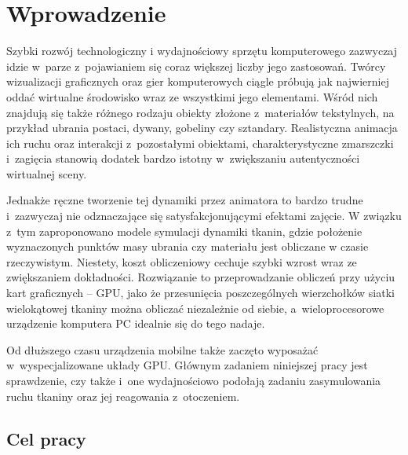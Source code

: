 \chapter{Wprowadzenie}
\label{t:wprowadzenie}

	
	Szybki rozwój technologiczny i wydajnościowy sprzętu komputerowego zazwyczaj idzie w~parze z~pojawianiem się coraz większej liczby jego zastosowań. Twórcy wizualizacji graficznych oraz gier komputerowych ciągle próbują jak najwierniej oddać wirtualne środowisko wraz ze wszystkimi jego elementami. Wśród nich znajdują się także różnego rodzaju obiekty złożone z~materiałów tekstylnych, na przykład ubrania postaci, dywany, gobeliny czy sztandary. Realistyczna animacja ich ruchu oraz interakcji z~pozostałymi obiektami, charakterystyczne zmarszczki i~zagięcia stanowią dodatek bardzo istotny w~zwiększaniu autentyczności wirtualnej sceny. 
	
	Jednakże ręczne tworzenie tej dynamiki przez animatora to bardzo trudne i~zazwyczaj nie odznaczające się satysfakcjonującymi efektami zajęcie. W związku z~tym zaproponowano modele symulacji dynamiki tkanin, gdzie położenie wyznaczonych punktów masy ubrania czy materiału jest obliczane w czasie rzeczywistym. Niestety, koszt obliczeniowy cechuje szybki wzrost wraz ze zwiększaniem dokładności. Rozwiązanie to przeprowadzanie obliczeń przy użyciu kart graficznych -- GPU, jako że przesunięcia poszczególnych wierzchołków siatki wielokątowej tkaniny można obliczać niezależnie od siebie, a~wieloprocesorowe urządzenie komputera PC idealnie się do tego nadaje.
	
	Od dłuższego czasu urządzenia mobilne także zaczęto wyposażać w~wyspecjalizowane układy GPU. Głównym zadaniem niniejszej pracy jest sprawdzenie, czy także i~one wydajnościowo podołają zadaniu zasymulowania ruchu tkaniny oraz jej reagowania z~otoczeniem.
		
	\section{Cel pracy}
	\label{t:wprowadzenie:cel}
	
